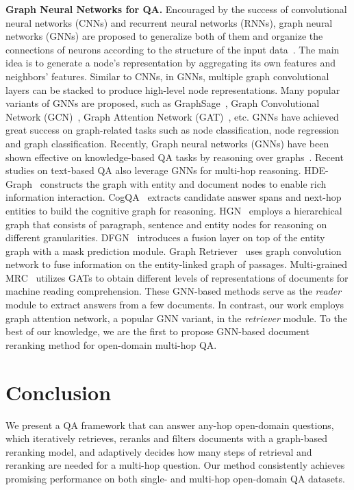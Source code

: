 \documentclass[sigconf]{acmart}
\begin{document}
\BlankLine
\noindent \textbf{Graph Neural Networks for QA.} Encouraged by the success of convolutional neural networks (CNNs) and recurrent neural networks (RNNs), graph neural networks (GNNs) are proposed to generalize both of them and organize the connections of neurons according to the structure of the input data~\cite{battaglia2018relational,wu2020comprehensive}. The main idea is to generate a node's representation by aggregating its own features and neighbors' features. Similar to CNNs, in GNNs, multiple graph convolutional layers can be stacked to produce high-level node representations. Many popular variants of GNNs are proposed, such as GraphSage~\cite{hamilton2017inductive}, Graph Convolutional Network (GCN)~\cite{Kipf:2016tc}, Graph Attention Network (GAT)~\cite{velickovic2018graph}, etc. GNNs have achieved great success on graph-related tasks such as node classification, node regression and graph classification.
Recently, Graph neural networks (GNNs) have been shown effective on knowledge-based QA tasks by reasoning over graphs~\cite{de-cao-etal-2019-question,sorokin-gurevych-2018-modeling,zhang2018variational}. Recent studies on text-based QA also leverage GNNs for multi-hop reasoning. HDE-Graph~\cite{tu-etal-2019-multi} constructs the graph with entity and document nodes to enable rich information interaction. CogQA~\cite{ding-etal-2019-cognitive} extracts candidate answer spans and next-hop entities to build the cognitive graph for reasoning. HGN~\cite{HGN2019} employs a hierarchical graph that consists of paragraph, sentence and entity nodes for reasoning on different granularities. DFGN~\cite{qiu-etal-2019-dynamically} introduces a fusion layer on top of the entity graph with a mask prediction module. Graph Retriever~\cite{min2019knowledge} uses graph convolution network to fuse information on the entity-linked graph of passages. Multi-grained MRC~\cite{zheng-etal-2020-document} utilizes GATs to obtain different levels of representations of documents for machine reading comprehension. These GNN-based methods serve as the \textit{reader} module to extract answers from a few documents. In contrast, our work employs graph attention network, a popular GNN variant, in the \textit{retriever} module. To the best of our knowledge, we are the first to propose GNN-based document reranking method for open-domain multi-hop QA.





\section{Conclusion}

We present a QA framework that can answer any-hop open-domain questions, which iteratively retrieves, reranks and filters documents with a graph-based reranking model, and adaptively decides how many steps of retrieval and reranking are needed for a multi-hop question. Our method consistently achieves promising performance on both single- and multi-hop open-domain QA datasets.


\tiny


\end{document}

